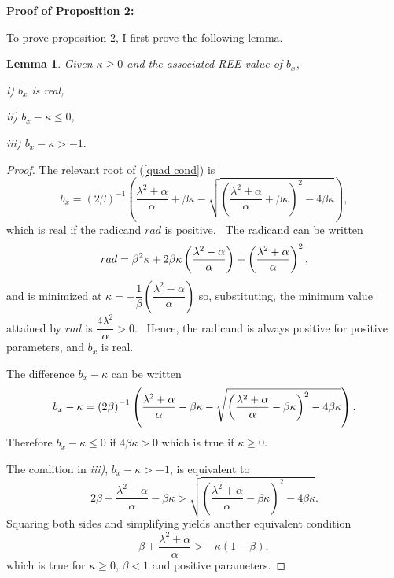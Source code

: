 \documentclass{article}
\newtheorem{lemma}{Lemma}
\begin{document}
\begin{doublespace}
\textbf{Proof of Proposition 2:}

To prove proposition 2, I first prove the following lemma.

\begin{lemma}
Given $\kappa \geq 0$ and the associated REE value of $b_{x}$,

i) $b_{x}$ is real,

ii) $b_{x}-\kappa \leq 0$,

iii) $b_{x}-\kappa >-1.$
\end{lemma}

\begin{proof}
The relevant root of (\ref{quad cond}) is%
\begin{equation*}
b_{x}=\left( 2\beta \right) ^{-1}\left( \frac{\lambda ^{2}+\alpha }{\alpha }%
+\beta \kappa -\sqrt{\left( \frac{\lambda ^{2}+\alpha }{\alpha }+\beta 
\kappa \right) ^{2}-4\beta \kappa }\right) ,
\end{equation*}%
which is real if the radicand $rad$ is positive. \ The radicand can be
written%
\begin{equation*}
rad=\beta ^{2}\kappa +2\beta \kappa \left( \dfrac{\lambda ^{2}-\alpha }{%
\alpha }\right) +\left( \frac{\lambda ^{2}+\alpha }{\alpha }\right) ^{2},
\end{equation*}%
and is minimized at $\kappa =-\dfrac{1}{\beta }\left( \dfrac{\lambda 
^{2}-\alpha }{\alpha }\right) $ so, substituting, the minimum value attained
by $rad$ is $\dfrac{4\lambda ^{2}}{\alpha }>0.$ \ Hence, the radicand is
always positive for positive parameters, and $b_{x}$ is real.

The difference $b_{x}-\kappa $ can be written%
\begin{equation*}
b_{x}-\kappa =\left( 2\beta \right) ^{-1}\left( \frac{\lambda ^{2}+\alpha }{%
\alpha }-\beta \kappa -\sqrt{\left( \frac{\lambda ^{2}+\alpha }{\alpha }%
-\beta \kappa \right) ^{2}-4\beta \kappa }\right) .
\end{equation*}%
Therefore $b_{x}-\kappa \leq 0$ if $4\beta \kappa >0$ which is true if $%
\kappa \geq 0$.

The condition in \textit{iii)}, $b_{x}-\kappa >-1$, is equivalent to 
\begin{equation*}
2\beta +\frac{\lambda ^{2}+\alpha }{\alpha }-\beta \kappa >\sqrt{\left( 
\frac{\lambda ^{2}+\alpha }{\alpha }-\beta \kappa \right) ^{2}-4\beta \kappa 
}.
\end{equation*}%
Squaring both sides and simplifying yields another equivalent condition%
\begin{equation*}
\beta +\frac{\lambda ^{2}+\alpha }{\alpha }>-\kappa \left( 1-\beta \right) ,
\end{equation*}%
which is true for $\kappa \geq 0$, $\beta <1$ and positive parameters.
\end{proof}


\end{doublespace}
\end{document}
